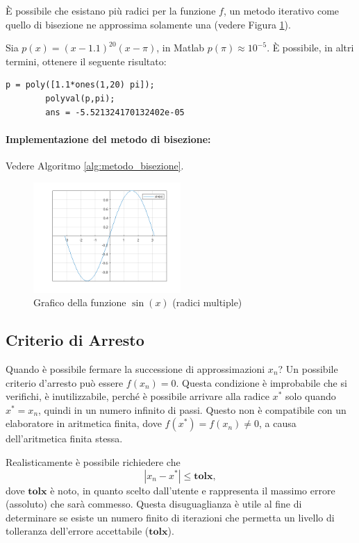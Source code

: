 È possibile che esistano più radici per la funzione $f$, un metodo iterativo come quello di bisezione ne approssima solamente una (vedere Figura \ref{fig:sinx}).


\begin{example}
	Sia $p(x)=(x-1.1)^{20}(x-\pi)$, in Matlab $p(\pi)\approx 10^{-5}$. È possibile, in altri termini, ottenere il seguente risultato:
	\begin{lstlisting}[style=Matlab-editor]
		p = poly([1.1*ones(1,20) pi]);
		polyval(p,pi);
		ans = -5.521324170132402e-05
	\end{lstlisting}
\end{example}

\paragraph{Implementazione del metodo di bisezione:} Vedere Algoritmo \ref{alg:metodo_bisezione}.

\begin{figure}
	\centering
	\includegraphics[width=0.5\textwidth]{immagini/tripleRadix.png}
	\caption{\label{fig:sinx}Grafico della funzione $\sin{(x)}$ (radici multiple)}
\end{figure}

\subsection{Criterio di Arresto}\label{sec:critArresto}
Quando è possibile fermare la successione di approssimazioni $x_n$? Un possibile criterio d'arresto può essere $f(x_n)=0$. Questa condizione è improbabile che si verifichi, è inutilizzabile, perché è possibile arrivare alla radice $x^*$ solo quando $x^*=x_n$, quindi in un numero infinito di passi. Questo non è compatibile con un elaboratore in aritmetica finita, dove $f(x^*)=f(x_n)\neq 0$, a causa dell'aritmetica finita stessa.

Realisticamente è possibile richiedere che 
\begin{equation}\label{eq:x_n_leq_tolx}
	|x_n-x^*|\leq \boldsymbol{tolx},
\end{equation}
dove $\boldsymbol{tolx}$ è noto, in quanto scelto dall'utente e rappresenta il massimo errore (assoluto) che sarà commesso. Questa disuguaglianza è utile al fine di determinare se esiste un numero finito di iterazioni che permetta un livello di tolleranza dell'errore accettabile ($\boldsymbol{tolx}$).

